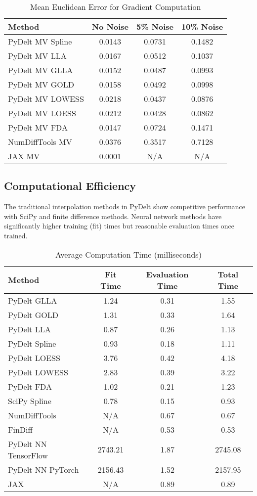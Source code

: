 \documentclass[10pt,journal,compsoc]{IEEEtran}
\begin{document}
\begin{table}[!t]
\caption{Mean Euclidean Error for Gradient Computation}
\label{tab:gradient}
\centering
\begin{tabular}{lccc}
\toprule
\textbf{Method} & \textbf{No Noise} & \textbf{5\% Noise} & \textbf{10\% Noise} \\
\midrule
PyDelt MV Spline & 0.0143 & 0.0731 & 0.1482 \\
PyDelt MV LLA & 0.0167 & 0.0512 & 0.1037 \\
PyDelt MV GLLA & 0.0152 & 0.0487 & 0.0993 \\
PyDelt MV GOLD & 0.0158 & 0.0492 & 0.0998 \\
PyDelt MV LOWESS & 0.0218 & 0.0437 & 0.0876 \\
PyDelt MV LOESS & 0.0212 & 0.0428 & 0.0862 \\
PyDelt MV FDA & 0.0147 & 0.0724 & 0.1471 \\
NumDiffTools MV & 0.0376 & 0.3517 & 0.7128 \\
JAX MV & 0.0001 & N/A & N/A \\
\bottomrule
\end{tabular}
\end{table}

\subsection{Computational Efficiency}

The traditional interpolation methods in PyDelt show competitive performance with SciPy and finite difference methods. Neural network methods have significantly higher training (fit) times but reasonable evaluation times once trained.

\begin{table}[!t]
\caption{Average Computation Time (milliseconds)}
\label{tab:computation_time}
\centering
\begin{tabular}{lccc}
\toprule
\textbf{Method} & \textbf{Fit Time} & \textbf{Evaluation Time} & \textbf{Total Time} \\
\midrule
PyDelt GLLA & 1.24 & 0.31 & 1.55 \\
PyDelt GOLD & 1.31 & 0.33 & 1.64 \\
PyDelt LLA & 0.87 & 0.26 & 1.13 \\
PyDelt Spline & 0.93 & 0.18 & 1.11 \\
PyDelt LOESS & 3.76 & 0.42 & 4.18 \\
PyDelt LOWESS & 2.83 & 0.39 & 3.22 \\
PyDelt FDA & 1.02 & 0.21 & 1.23 \\
SciPy Spline & 0.78 & 0.15 & 0.93 \\
NumDiffTools & N/A & 0.67 & 0.67 \\
FinDiff & N/A & 0.53 & 0.53 \\
PyDelt NN TensorFlow & 2743.21 & 1.87 & 2745.08 \\
PyDelt NN PyTorch & 2156.43 & 1.52 & 2157.95 \\
JAX & N/A & 0.89 & 0.89 \\
\bottomrule
\end{tabular}
\end{table}
\end{document}

